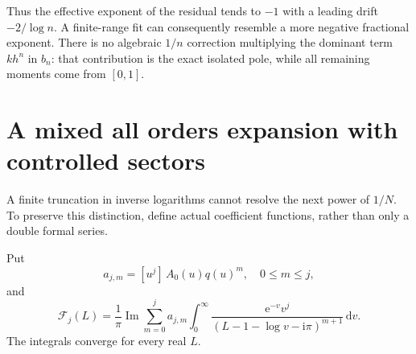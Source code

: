 \documentclass[11pt,letterpaper]{article}
\theoremstyle{remark}\newtheorem{remark}[theorem]{Remark}
\newcommand{\dd}{\,\mathrm d}
\newcommand{\ii}{\mathrm i}
\newcommand{\im}{\operatorname{Im}}
\newcommand{\ee}{\mathrm e}
\begin{document}
Thus the effective exponent of the residual tends to $-1$ with a leading drift $-2/\log n$. A finite-range fit can consequently resemble a more negative fractional exponent. There is no algebraic $1/n$ correction multiplying the dominant term $kh^n$ in $b_n$: that contribution is the exact isolated pole, while all remaining moments come from $[0,1]$.

\section{A mixed all orders expansion with controlled sectors}
A finite truncation in inverse logarithms cannot resolve the next power of $1/N$. To preserve this distinction, define actual coefficient functions, rather than only a double formal series.

Put
\begin{equation}
a_{j,m}=[u^j]\,A_0(u)q(u)^m,\quad0\le m\le j,\label{ccp:eq:ajm}
\end{equation}
and
\begin{equation}
\mathcal F_j(L)=\frac1\pi\im\sum_{m=0}^j a_{j,m}
\int_0^\infty\frac{\ee^{-v}v^j}{(L-1-\log v-\ii\pi)^{m+1}}\dd v.\label{ccp:eq:Fj}
\end{equation}
The integrals converge for every real $L$.
\end{document}
